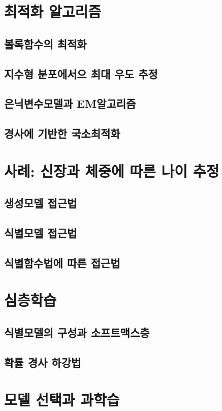 \documentclass{book}
\begin{document}
\section{최적화 알고리즘}
\subsection{볼록함수의 최적화}
\subsection{지수형 분포에서으 최대 우도 추정}
\subsection{은닉변수모델과 EM알고리즘}
\subsection{경사에 기반한 국소최적화}
\section{사례: 신장과 체중에 따른 나이 추정}
\subsection{생성모델 접근법}
\subsection{식별모델 접근법}
\subsection{식별함수법에 따른 접근법}

\section{심층학습}
\subsection{식별모델의 구성과 소프트맥스층}
\subsection{확률 경사 하강법}

\section{모델 선택과 과학습}
\end{document}
